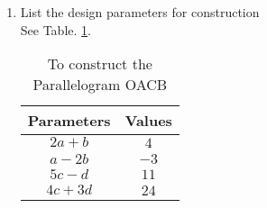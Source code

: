 \renewcommand{\theequation}{\theenumi}
\begin{enumerate}[label=\thesection.\arabic*.,ref=\thesection.\theenumi]


%
%
%
\item List the design parameters for construction
\label{const:table1}
\\
\solution See Table. \ref{table:table1}. 
%
\begin{table}[ht!]
\centering
\begin{tabular}{ |p{3cm}|p{3cm}|  }
\hline
Parameters & Values \\
\hline
$$2a+b $$ & $$ 4 $$\\
\hline
$$a-2b$$ & $$-3 $$\\
\hline
$$5c-d$$ & $$ 11 $$\\
\hline
$$4c+3d$$ & $$24$$\\
\hline
\end{tabular}
%
\caption{To construct the Parallelogram OACB}
\label{table:table1}	
\end{table}


\end{enumerate}
